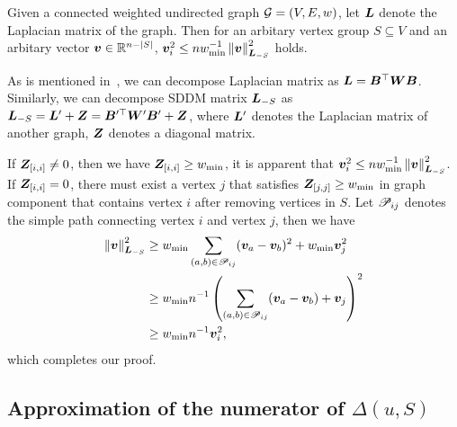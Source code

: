 \documentclass[10pt,journal,compsoc,twocolumn,twoside]{IEEEtran}
\begin{document}
\begin{lemma}\label{lem:norm-ineq}
    Given a connected weighted undirected graph \(\mathcal{G}=(V,E,w)\), let \(\boldsymbol{L}\) denote the Laplacian matrix of the graph.
    Then for an arbitary vertex group \(S\subseteq V\) and an arbitary vector \(\boldsymbol{v}\in\mathbb{R}^{n-\left|S \right|}\), \(\boldsymbol{v}_i^2\le nw_{\min}^{-1}\left\Vert\boldsymbol{v}\right\Vert^2_{\boldsymbol{L}_{-S}}\) holds.
\end{lemma}

\begin{IEEEproof}
    As is mentioned in~, we can decompose Laplacian matrix as \(\boldsymbol{L}=\boldsymbol{B}^\top\boldsymbol{W}\boldsymbol{B}\).
    Similarly, we can decompose SDDM matrix \(\boldsymbol{L}_{-S}\) as \(\boldsymbol{L}_{-S}=\boldsymbol{L}'+\boldsymbol{Z}=\boldsymbol{B}'^\top\boldsymbol{W}'\boldsymbol{B}'+\boldsymbol{Z}\), where \(\boldsymbol{L}'\) denotes the Laplacian matrix of another graph, \(\boldsymbol{Z}\) denotes a diagonal matrix.

    If \(\boldsymbol{Z}_{[i,i]}\neq0\), then we have \(\boldsymbol{Z}_{[i,i]}\ge w_{\min}\), it is apparent that \(\boldsymbol{v}_i^2\le nw_{\min}^{-1}\left\Vert\boldsymbol{v}\right\Vert^2_{\boldsymbol{L}_{-S}}\).
    If \(\boldsymbol{Z}_{[i,i]}=0\), there must exist a vertex \(j\) that satisfies \(\boldsymbol{Z}_{[j,j]}\ge w_{\min}\) in graph component that contains vertex \(i\) after removing vertices in \(S\).
    Let \(\mathscr{P}_{ij}\) denotes the simple path connecting vertex \(i\) and vertex \(j\), then we have
    \begin{align*}
        \left\Vert\boldsymbol{v}\right\Vert^2_{\boldsymbol{L}_{-S}}
         & \ge w_{\min}\sum_{\left( a,b \right)\in\mathscr{P}_{ij}}(\boldsymbol{v}_a-\boldsymbol{v}_b)^2+w_{\min}\boldsymbol{v}_j^2     \\
         & \ge w_{\min}n^{-1}\left( \sum_{\left( a,b \right)\in\mathscr{P}_{ij}}(\boldsymbol{v}_a-\boldsymbol{v}_b)+\boldsymbol{v}_j \right)^2 \\
         & \ge w_{\min}n^{-1}\boldsymbol{v}_i^2,
    \end{align*}
    which completes our proof.
\end{IEEEproof}

\subsection{Approximation of the numerator of \(\Delta(u,S)\)}
\end{document}
